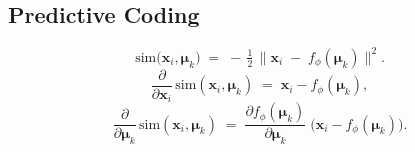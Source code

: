 \documentclass{article}
\begin{document}
\subsection*{Predictive Coding}
\[
\mathrm{sim}\bigl(\bm{x}_i,\bm{\mu}_k\bigr)
\;=\;
-\,\tfrac12\,
\bigl\|\bm{x}_i \;-\; f_\phi(\bm{\mu}_k)\bigr\|^2.
\]
\[
\frac{\partial}{\partial \bm{x}_i}\,\mathrm{sim}(\bm{x}_i,\bm{\mu}_k)
\;=\;
\bm{x}_i - f_\phi(\bm{\mu}_k),
\]
\[
\frac{\partial}{\partial \bm{\mu}_k}\,\mathrm{sim}(\bm{x}_i,\bm{\mu}_k)
\;=\;
\frac{\partial f_\phi(\bm{\mu}_k)}{\partial \bm{\mu}_k}
\;\bigl(\bm{x}_i - f_\phi(\bm{\mu}_k)\bigr).
\]
\end{document}
